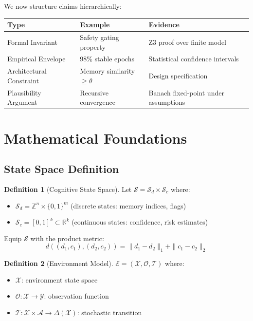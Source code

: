 \documentclass[12pt]{article}
\theoremstyle{definition}
\newtheorem{definition}{Definition}[section]
\newcommand{\env}{\mathcal{E}}
\begin{document}
We now structure claims hierarchically:

\begin{center}
\begin{tabular}{|l|l|l|}
\hline
\textbf{Type} & \textbf{Example} & \textbf{Evidence} \\
\hline
Formal Invariant & Safety gating property & Z3 proof over finite model \\
Empirical Envelope & 98\% stable epochs & Statistical confidence intervals \\
Architectural Constraint & Memory similarity $\geq\theta$ & Design specification \\
Plausibility Argument & Recursive convergence & Banach fixed-point under assumptions \\
\hline
\end{tabular}
\end{center}

\section{Mathematical Foundations}

\subsection{State Space Definition}

\begin{definition}[Cognitive State Space]
Let $\mathcal{S} = \mathcal{S}_d \times \mathcal{S}_c$ where:
\begin{itemize}
    \item $\mathcal{S}_d = \mathbb{Z}^n \times \{0,1\}^m$ (discrete states: memory indices, flags)
    \item $\mathcal{S}_c = [0,1]^k \subset \mathbb{R}^k$ (continuous states: confidence, risk estimates)
\end{itemize}
Equip $\mathcal{S}$ with the product metric:
\[
d((d_1,c_1), (d_2,c_2)) = \|d_1 - d_2\|_1 + \|c_1 - c_2\|_2
\]
\end{definition}

\begin{definition}[Environment Model]
$\env = (\mathcal{X}, \mathcal{O}, \mathcal{T})$ where:
\begin{itemize}
    \item $\mathcal{X}$: environment state space
    \item $\mathcal{O}: \mathcal{X} \to \mathcal{Y}$: observation function
    \item $\mathcal{T}: \mathcal{X} \times \mathcal{A} \to \Delta(\mathcal{X})$: stochastic transition
\end{itemize}
\end{definition}
\end{document}
